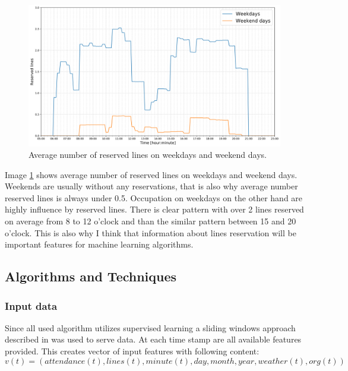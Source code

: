 \documentclass{article}
\begin{document}
\begin{figure}[H]
\centering
\includegraphics[width=13cm]{imgs/avg_lines.png}
\caption{Average number of reserved lines on weekdays and weekend days.}
\label{fig:lines_averages}
\end{figure}

Image \ref{fig:lines_averages} shows average number of reserved lines on weekdays and weekend days. Weekends are usually without any reservations, that is also why average number reserved lines is always under 0.5. Occupation on weekdays on the other hand are highly influence by reserved lines. There is clear pattern with over 2 lines reserved on average from 8 to 12 o'clock and than the similar pattern between 15 and 20 o'clock. This is also why I think that information about lines reservation will be important features for machine learning algorithms.

\subsection{Algorithms and Techniques}
\subsubsection{Input data}
Since all used algorithm utilizes supervised learning a sliding windows approach described in \citep{brownlee2019howtosupervised} was used to serve data. At each time stamp are all available features provided. This creates vector of input features with following content:
\begin{equation}
\label{eq:input_vector}
v(t) = (attendance(t), lines(t), minute(t), day, month, year, weather(t), org(t))
\end{equation}
\end{document}

